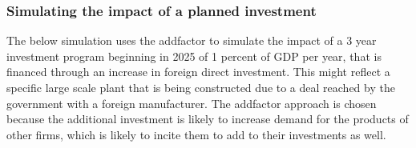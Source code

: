 \documentclass[letterpaper,10pt,english]{jupyterBook}
\begin{document}
\subsubsection{Simulating the impact of a planned investment}
\label{\detokenize{content/06_WBModels/ScenarioAnalysis:simulating-the-impact-of-a-planned-investment}}
\sphinxAtStartPar
The below simulation uses the add\sphinxhyphen{}factor to simulate the impact of a 3 year investment  program beginning in 2025 of 1 percent of GDP per year, that is financed through an increase in foreign direct investment. This might reflect a specific large scale plant that is being constructed due to a deal reached by the government with a foreign manufacturer.  The add\sphinxhyphen{}factor approach is chosen because the additional investment is likely to increase demand for the products of other firms, which is likely to incite them to add to their investments as well.
\end{document}
